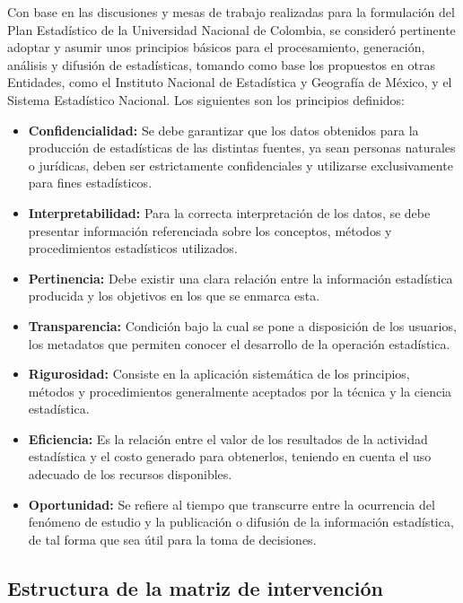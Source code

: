 \documentclass[
]{book}
\begin{document}
Con base en las discusiones y mesas de trabajo realizadas para la formulación del Plan Estadístico de la Universidad Nacional de Colombia, se consideró pertinente adoptar y asumir unos principios básicos para el procesamiento, generación, análisis y difusión de estadísticas, tomando como base los propuestos en otras Entidades, como el Instituto Nacional de Estadística y Geografía de México, y el Sistema Estadístico Nacional. Los siguientes son los principios definidos:

\begin{itemize}
\item
  \textbf{Confidencialidad:} Se debe garantizar que los datos obtenidos para la producción de estadísticas de las distintas fuentes, ya sean personas naturales o jurídicas, deben ser estrictamente confidenciales y utilizarse exclusivamente para fines estadísticos.
\item
  \textbf{Interpretabilidad:} Para la correcta interpretación de los datos, se debe presentar información referenciada sobre los conceptos, métodos y procedimientos estadísticos utilizados.
\item
  \textbf{Pertinencia:} Debe existir una clara relación entre la información estadística producida y los objetivos en los que se enmarca esta.
\item
  \textbf{Transparencia:} Condición bajo la cual se pone a disposición de los usuarios, los metadatos que permiten conocer el desarrollo de la operación estadística.
\item
  \textbf{Rigurosidad:} Consiste en la aplicación sistemática de los principios, métodos y procedimientos generalmente aceptados por la técnica y la ciencia estadística.
\item
  \textbf{Eficiencia:} Es la relación entre el valor de los resultados de la actividad estadística y el costo generado para obtenerlos, teniendo en cuenta el uso adecuado de los recursos disponibles.
\item
  \textbf{Oportunidad:} Se refiere al tiempo que transcurre entre la ocurrencia del fenómeno de estudio y la publicación o difusión de la información estadística, de tal forma que sea útil para la toma de decisiones.
\end{itemize}

\hypertarget{estructura-de-la-matriz-de-intervenciuxf3n}{%
\subsection{Estructura de la matriz de intervención}\label{estructura-de-la-matriz-de-intervenciuxf3n}}
\end{document}
